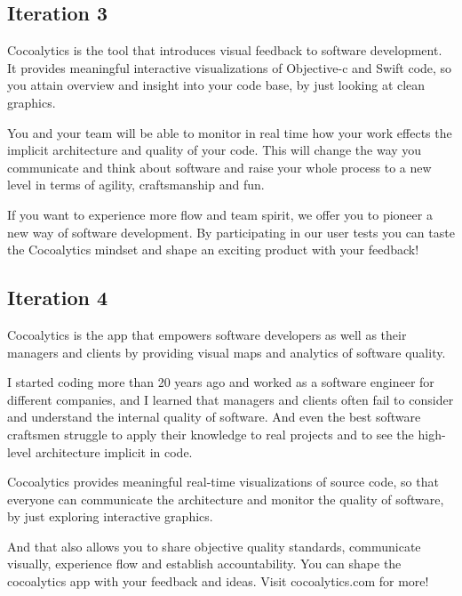 \documentclass{article}
\begin{document}
\subsection{Iteration 3}

Cocoalytics is the tool that introduces visual feedback to software development. It provides meaningful interactive visualizations of Objective-c and Swift code, so you attain overview and insight into your code base, by just looking at clean graphics.

You and your team will be able to monitor in real time how your work effects the implicit architecture and quality of your code. This will change the way you communicate and think about software and raise your whole process to a new level in terms of agility, craftsmanship and fun.

If you want to experience more flow and team spirit, we offer you to pioneer a new way of software development. By participating in our user tests you can taste the Cocoalytics mindset and shape an exciting product with your feedback!

\subsection{Iteration 4}

Cocoalytics is the app that empowers software developers as well as their managers and clients by providing visual maps and analytics of software quality.

I started coding more than 20 years ago and worked as a software engineer for different companies, and I learned that managers and clients often fail to consider and understand the internal quality of software. And even the best software craftsmen struggle to apply their knowledge to real projects and to see the  high-level architecture implicit in code.

Cocoalytics provides meaningful real-time visualizations of source code, so that everyone can communicate the architecture and monitor the quality of software, by just exploring interactive graphics.

And that also allows you to share objective quality standards, communicate visually, experience flow and establish accountability. You can shape the cocoalytics app with your feedback and ideas. Visit cocoalytics.com for more!

\pagebreak
\nocite{*}

%
\end{document}
